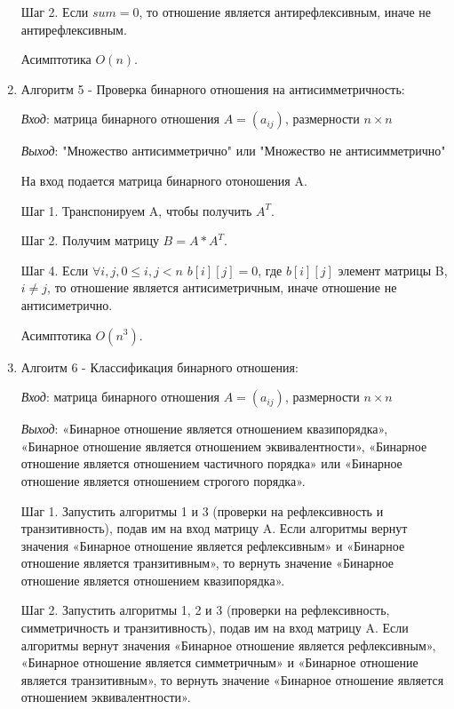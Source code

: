 \documentclass[spec, och, labwork]{shiza}
\begin{document}
\begin{enumerate}
                Шаг 2. Если $sum = 0$, то отношение является антирефлексивным, иначе не антирефлексивным.

                Асимптотика $O(n)$.

                \item Алгоритм 5 - Проверка бинарного отношения на антисимметричность:
                
                \textit{Вход}: матрица бинарного отношения $A = (a_{ij})$, размерности $n \times n$

                \textit{Выход}: "Множество антисимметрично" или "Множество не антисимметрично"

                На вход подается матрица бинарного отоношения A. 

                Шаг 1. Транспонируем A, чтобы получить $A^T$.

                Шаг 2. Получим матрицу $B = A * A^T$.

                Шаг 4. Если $ \forall i, j, 0 \leq i, j < n$ $b[i][j]  = 0$, где 
                $b[i][j]$ элемент матрицы B, $i \neq j$, то отношение является антисиметричным, иначе отношение не антисиметрично.

                Асимптотика $O(n^3)$.

                \item Алгоитм 6 - Классификация бинарного отношения:
                
                \textit{Вход}: матрица бинарного отношения $A = (a_{ij})$, размерности $n \times n$

                \textit{Выход}: «Бинарное отношение является отношением квазипорядка», «Бинарное отношение является отношением 
                эквивалентности», «Бинарное отношение является отношением частичного порядка» или «Бинарное отношение 
                является отношением строгого порядка».

                Шаг 1. Запустить алгоритмы 1 и 3 (проверки на рефлексивность и транзитивность), подав им на вход матрицу A. Если алгоритмы вернут значения «Бинарное отношение является рефлексивным» и «Бинарное отношение является транзитивным», то вернуть значение «Бинарное отношение является отношением квазипорядка».

                Шаг 2. Запустить алгоритмы 1, 2 и 3 (проверки на рефлексивность, симметричность и транзитивность), подав им на вход матрицу A. Если алгоритмы вернут значения «Бинарное отношение является рефлексивным», «Бинарное отношение является симметричным» и «Бинарное отношение является транзитивным», то вернуть значение «Бинарное отношение является отношением эквивалентности».


\end{enumerate}
\end{document}
